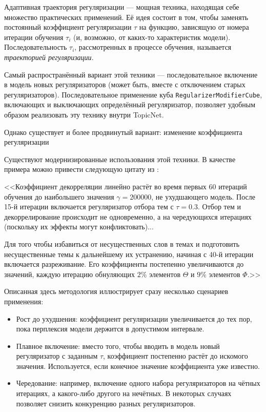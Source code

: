 
Адаптивная траектория регуляризации --- мощная техника, находящая себе множество практических применений. Её идея состоит в том, чтобы заменять постоянный коэффициент регуляризации $\tau$ на функцию, зависящую от номера итерации обучения $\tau_i$ (и, возможно, от каких-то характеристик модели). Последовательность $\tau_i$, рассмотренных в процессе обучения, называется \textit{траекторией регуляризации}.  

Самый распространённый вариант этой техники --- последовательное включение в модель новых регуляризаторов (может быть, вместе с отключением старых регуляризаторов). Последовательное применение куба \texttt{RegularizerModifierCube}, включающих и выключающих определённый регуляризатор, позволяет удобным образом реализовать эту технику внутри TopicNet.  

Однако существует и более продвинутый вариант: изменение коэффициента регуляризации

Существуют модернизированные использования этой техники. В качестве примера можно привести следующую цитату из \cite{plavin}: 

<<Коэффициент декорреляции линейно растёт во время первых 60 итераций обучения до наибольшего значения $\gamma = 200000$, не ухудшающего модель. После 15-й итерации включается регуляризатор отбора тем с $\tau=0.3$. Отбор тем и декоррелирование происходит не одновременно, а на чередующихся итерациях (поскольку их эффекты могут конфликтовать)...  

Для того чтобы избавиться от несущественных слов в темах и подготовить несущественные темы к дальнейшему их устранению, начиная с 40-й итерации включается разреживание. Его коэффициенты постепенно увеличиваются до значений, каждую итерацию обнуляющих $2\%$ элементов $\Theta$ и $9\%$ элементов $\Phi$.>> 

Описанная здесь методология иллюстрирует сразу несколько сценариев применения: 

\begin{itemize}

    \item Рост до ухудшения: коэффициент регуляризации увеличивается до тех пор, пока перплексия модели держится в допустимом интервале.

    \item Плавное включение: вместо того, чтобы вводить в модель новый регуляризатор с заданным $\tau$, коэффициент постепенно растёт до искомого значения. Используется, если конечное значение коэффициента уже известно.


    \item Чередование: например, включение одного набора регуляризаторов на чётных итерациях, а какого-либо другого на нечётных. В некоторых случаях позволяет снизить конкуренцию разных регуляризаторов.

\end{itemize} 

